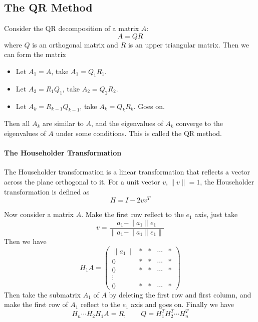 \documentclass{matharticle}
\begin{document}
\subsection{The QR Method}
Consider the QR decomposition of a matrix $A$:
\begin{equation}
	A = Q R
\end{equation}
where $Q$ is an orthogonal matrix and $R$ is an upper triangular matrix. Then we can form the matrix
\begin{itemize}
	\item Let $A_1 = A$, take $A_1 = Q_1 R_1$.
	\item Let $A_2 = R_1 Q_1$, take $A_2 = Q_2 R_2$.
	\item Let $A_k = R_{k-1} Q_{k-1}$, take $A_k = Q_k R_k$. Goes on.
\end{itemize}
Then all $A_k$ are similar to $A$, and the eigenvalues of $A_k$ converge to the eigenvalues of $A$ under some conditions. This is called the QR method.

\paragraph{The Householder Transformation}
The Householder transformation is a linear transformation that reflects a vector across the plane orthogonal to it. For a unit vector $v, \|v\| = 1$, the Householder transformation is defined as
\begin{equation}
	H = I - 2 v v^T
\end{equation}

Now consider a matrix $A$. Make the first row reflect to the $e_1$ axis, just take
\begin{equation}
	v = \frac{a_1 - \|a_1\| e_1}{\|a_1 - \|a_1\| e_1\|}
\end{equation}
Then we have
\begin{equation}
	H_1 A = \begin{pmatrix}
		\|a_1\| & * & * & \cdots & * \\
		0       & * & * & \cdots & * \\
		0       & * & * & \cdots & * \\
		\vdots  &   &   &        &   \\
		0       & * & * & \cdots & *
	\end{pmatrix}
\end{equation}
Then take the submatrix $A_1$ of $A$ by deleting the first row and first column, and make the first row of $A_1$ reflect to the $e_1$ axis and goes on. Finally we have
\begin{equation}
	H_n \cdots H_2 H_1 A = R, \qquad Q = H_1^T H_2^T \cdots H_n^T
\end{equation}
\end{document}
